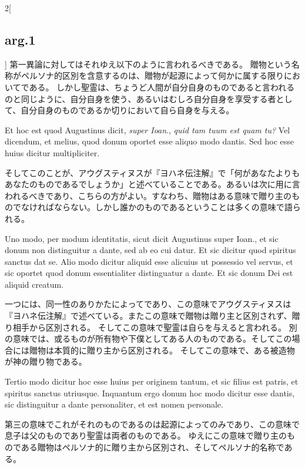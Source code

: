 \documentclass[paper=a4paper,fontsize=10pt,jafontsize=9pt,titlepage]{jlreq}
\begin{document}
\begin{paracol}{2}[\subsection{arg.1}]
第一異論に対してはそれゆえ以下のように言われるべきである。
贈物という名称がペルソナ的区別を含意するのは、贈物が起源によって何かに属する限りにおいてである。
しかし聖霊は、ちょうど人間が自分自身のものであると言われるのと同じように、自分自身を使う、あるいはむしろ自分自身を享受する者として、自分自身のものであるか切りにおいて自ら自身を与える。

\switchcolumn*

Et hoc est quod Augustinus
dicit, \textit{super Ioan}., \textit{quid tam tuum est quam tu?} Vel dicendum, et melius, quod
donum oportet esse aliquo modo dantis. Sed hoc esse huius dicitur
multipliciter.

\switchcolumn

そしてこのことが、アウグスティヌスが『ヨハネ伝注解』で「何があなたよりもあなたのものであるでしょうか」と述べていることである。あるいは次に用に言われるべきであり、こちらの方がよい。すなわち、贈物はある意味で贈り主のものでなければならない。しかし誰かのものであるということは多くの意味で語られる。

\switchcolumn*

Uno modo, per modum identitatis, sicut dicit Augustinus super
Ioan., et sic donum non distinguitur a dante, sed ab eo cui datur. Et sic
dicitur quod spiritus sanctus dat se. Alio modo dicitur aliquid esse alicuius
ut possessio vel servus, et sic oportet quod donum essentialiter distinguatur a
dante. Et sic donum Dei est aliquid creatum.

\switchcolumn

一つには、同一性のありかたによってであり、この意味でアウグスティヌスは『ヨハネ伝注解』で述べている。またこの意味で贈物は贈り主と区別されず、贈り相手から区別される。
そしてこの意味で聖霊は自らを与えると言われる。
別の意味では、或るものが所有物や下僕としてある人のものである。そしてこの場合には贈物は本質的に贈り主から区別される。
そしてこの意味で、ある被造物が神の贈り物である。

\switchcolumn*

Tertio modo dicitur hoc esse huius
per originem tantum, et sic filius est patris, et spiritus sanctus utriusque.
Inquantum ergo donum hoc modo dicitur esse dantis, sic distinguitur a dante
personaliter, et est nomen personale.

\switchcolumn

第三の意味でこれがそれのものであるのは起源によってのみであり、この意味で息子は父のものであり聖霊は両者のものである。
ゆえにこの意味で贈り主のものである贈物はペルソナ的に贈り主から区別され、そしてペルソナ的名称である。


\end{paracol}
\end{document}
